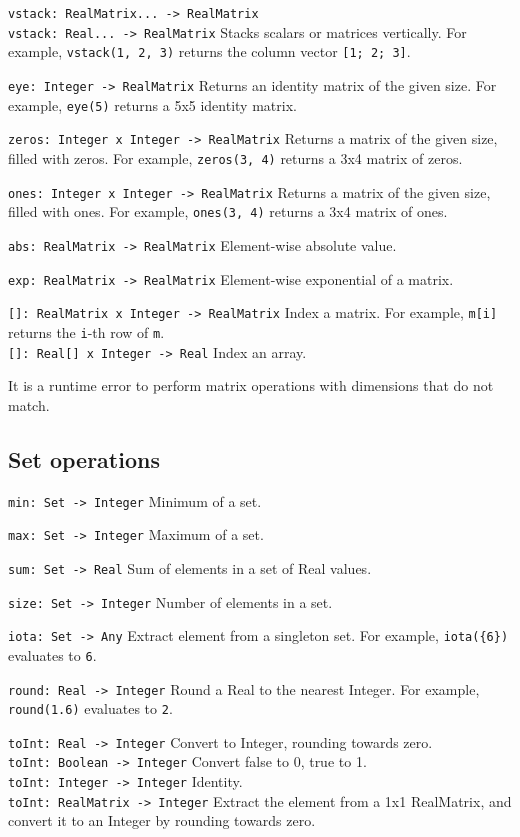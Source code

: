 \verb|vstack: RealMatrix... -> RealMatrix| \\
\verb|vstack: Real... -> RealMatrix| Stacks scalars or matrices vertically. For
example, \verb|vstack(1, 2, 3)| returns the column vector {\tt [1; 2; 3]}.

\verb|eye: Integer -> RealMatrix| Returns an identity matrix of the given size.
For example, \verb|eye(5)| returns a 5x5 identity matrix.

\verb|zeros: Integer x Integer -> RealMatrix| Returns a matrix of the given size, filled with zeros.  For example, \verb|zeros(3, 4)| returns a 3x4 matrix of zeros.

\verb|ones: Integer x Integer -> RealMatrix| Returns a matrix of the given
size, filled with ones.  For example, \verb|ones(3, 4)| returns a 3x4 matrix of
ones.

\verb|abs: RealMatrix -> RealMatrix| Element-wise absolute value.

\verb|exp: RealMatrix -> RealMatrix| Element-wise exponential of a matrix.

\verb|[]: RealMatrix x Integer -> RealMatrix| Index a matrix. For example,
\verb|m[i]| returns the \verb|i|-th row of \verb|m|. \\
\verb|[]: Real[] x Integer -> Real| Index an array.

It is a runtime error to perform matrix operations with dimensions that do not
match.


\subsection{Set operations}
\label{sec:builtin-set-ops}

\verb|min: Set -> Integer| Minimum of a set.

\verb|max: Set -> Integer| Maximum of a set.

\verb|sum: Set -> Real| Sum of elements in a set of Real values.

\verb|size: Set -> Integer| Number of elements in a set.

\verb|iota: Set -> Any| Extract element from a singleton set. For example,
\verb|iota({6})| evaluates to \verb|6|.


\verb|round: Real -> Integer| Round a Real to the nearest Integer.  For
example, \verb|round(1.6)| evaluates to \verb|2|.

\verb|toInt: Real -> Integer| Convert to Integer, rounding towards zero. \\
\verb|toInt: Boolean -> Integer| Convert false to 0, true to 1. \\
\verb|toInt: Integer -> Integer| Identity. \\
\verb|toInt: RealMatrix -> Integer| Extract the element from a 1x1 RealMatrix,
and convert it to an Integer by rounding towards zero.

